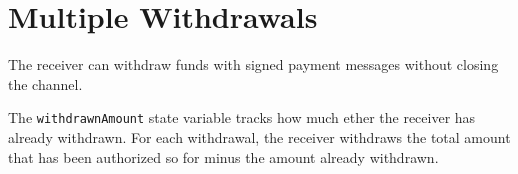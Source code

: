 \section{Multiple Withdrawals}\label{sec:multiple-withdrawals}
The receiver can withdraw funds with signed payment messages without closing the channel.



The \texttt{withdrawnAmount} state variable tracks how much ether the receiver has already withdrawn.
For each withdrawal, the receiver withdraws the total amount that has been authorized so for minus the amount already
withdrawn.